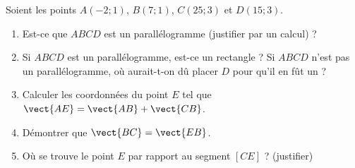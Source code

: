 
\begin{exercice}\label{exosmath-0669}

    Soient les points \( A(-2;1)\), \( B(7;1)\), \( C(25;3)\) et \( D(15;3)\).
    \begin{enumerate}
        \item
            Est-ce que \( ABCD\) est un parallélogramme (justifier par un calcul) ? 
        \item
            Si \( ABCD\) est un parallélogramme, est-ce un rectangle ? Si \( ABCD\) n'est pas un parallélogramme, où aurait-t-on dû placer \( D\) pour qu'il en fût un ?
        \item
            Calculer les coordonnées du point \( E\) tel que \( \vect{ AE }=\vect{ AB }+\vect{ CB }\).
        \item
            Démontrer que \( \vect{ BC }=\vect{ EB }\).
        \item
            Où se trouve le point \( E\) par rapport au segment \( [CE]\) ? (justifier)
    \end{enumerate}

\end{exercice}
